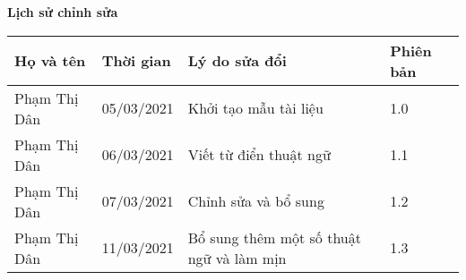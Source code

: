 \documentclass[./main.tex]{subfiles}
\begin{document}
	\begin{center}
		\Large{\textbf{Lịch sử chỉnh sửa}}
		\begin{table}[H]
\begin{tabular}{|p{}|p{}|p{}|p{}|}
				\hline
				\textbf{Họ và tên} & \textbf{Thời gian} & \textbf{Lý do sửa đổi}                   & \textbf{Phiên bản} \\ \hline
				Phạm Thị Dân       & 05/03/2021         & Khởi tạo mẫu tài liệu                    & 1.0                \\ \hline
				Phạm Thị Dân       & 06/03/2021         & Viết từ điển thuật ngữ                   & 1.1                \\ \hline
				Phạm Thị Dân       & 07/03/2021         & Chỉnh sửa và bổ sung                     & 1.2                \\ \hline
				Phạm Thị Dân       & 11/03/2021         & Bổ sung thêm một số thuật ngữ và làm mịn & 1.3                \\ \hline
			\end{tabular}
		\end{table}
	\end{center}
	
\end{document}
